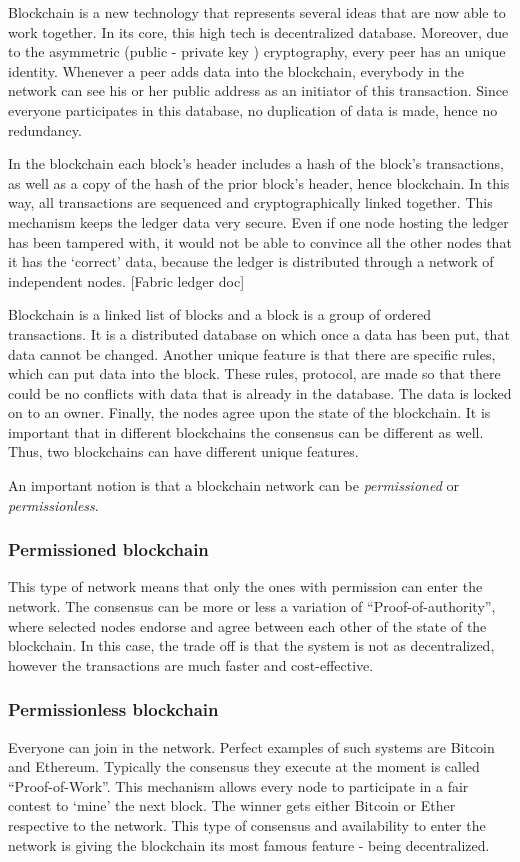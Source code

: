 \documentclass[a4paper,11pt]{report}
\begin{document}
Blockchain is a new technology that represents several ideas that are now able to work together. In its core, this high tech is decentralized database. Moreover, due to the asymmetric (public - private key ) cryptography, every peer has an unique identity. Whenever a peer adds data into the blockchain, everybody in the network can see his or her public address as an initiator of this transaction. Since everyone participates in this database, no duplication of data is made, hence no redundancy. 

In the blockchain each block’s header includes a hash of the block’s transactions, as well as a copy of the hash of the prior block’s header, hence blockchain. In this way, all transactions are sequenced and cryptographically linked together. This mechanism keeps the ledger data very secure. Even if one node hosting the ledger has been tampered with, it would not be able to convince all the other nodes that it has the ‘correct’ data, because the ledger is distributed through a network of independent nodes. [Fabric ledger doc] 
 
	Blockchain is a linked list of blocks and a block is a group of ordered transactions. It is a distributed database on which once a data has been put, that data cannot be changed. Another unique feature is that there are specific rules, which can put data into the block. These rules, protocol, are made so that there could be no conflicts with data that is already in the database. The data is locked on to an owner. Finally, the nodes agree upon the state of the blockchain.\cite{whatIsBlockchain} It is important that in different blockchains the consensus can be different as well. Thus, two blockchains can have different unique features.
	
	An important notion is that a blockchain network can be \textit{permissioned} or \textit{permissionless}.

\subsubsection{Permissioned blockchain}
This type of network means that only the ones with permission can enter the network. The consensus can be more or less a variation of “Proof-of-authority”, where selected nodes endorse and agree between each other of the state of the blockchain. In this case, the trade off is that the system is not as decentralized, however the transactions are much faster and cost-effective.

\subsubsection{Permissionless blockchain}
Everyone can join in the network. Perfect examples of such systems are Bitcoin and Ethereum. Typically the consensus they execute at the moment is called “Proof-of-Work”. This mechanism allows every node to participate in a fair contest to ‘mine’ the next block. The winner gets either Bitcoin or Ether respective to the network. This type of consensus and availability to enter the network is giving the blockchain its most famous feature - being decentralized.
\end{document}
